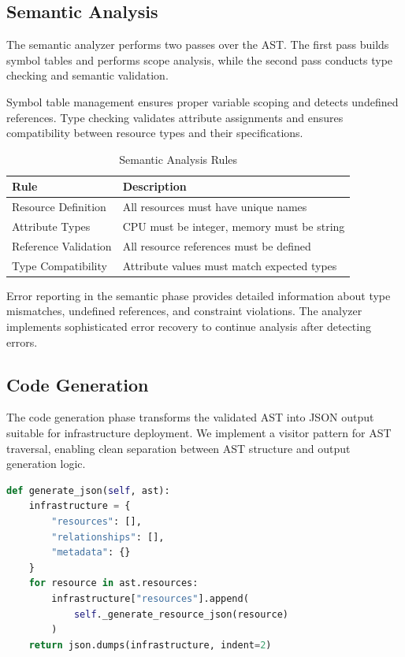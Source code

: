 \documentclass[journal,twocolumn,10pt]{IEEEtran}
\begin{document}
\subsection{Semantic Analysis}

The semantic analyzer performs two passes over the AST. The first pass builds symbol tables and performs scope analysis, while the second pass conducts type checking and semantic validation.

Symbol table management ensures proper variable scoping and detects undefined references. Type checking validates attribute assignments and ensures compatibility between resource types and their specifications.

\begin{table}[ht]
    \centering
    \caption{Semantic Analysis Rules}
    \label{tab:semantic_rules}
    \begin{tabular}{ll}
        \toprule
        Rule & Description \\
        \midrule
        Resource Definition & All resources must have unique names \\
        Attribute Types & CPU must be integer, memory must be string \\
        Reference Validation & All resource references must be defined \\
        Type Compatibility & Attribute values must match expected types \\
        \bottomrule
    \end{tabular}
\end{table}

Error reporting in the semantic phase provides detailed information about type mismatches, undefined references, and constraint violations. The analyzer implements sophisticated error recovery to continue analysis after detecting errors.

\subsection{Code Generation}

The code generation phase transforms the validated AST into JSON output suitable for infrastructure deployment. We implement a visitor pattern for AST traversal, enabling clean separation between AST structure and output generation logic.

\begin{lstlisting}[language=Python, caption=Code Generation Example]
def generate_json(self, ast):
    infrastructure = {
        "resources": [],
        "relationships": [],
        "metadata": {}
    }
    for resource in ast.resources:
        infrastructure["resources"].append(
            self._generate_resource_json(resource)
        )
    return json.dumps(infrastructure, indent=2)
\end{lstlisting}
\end{document}
